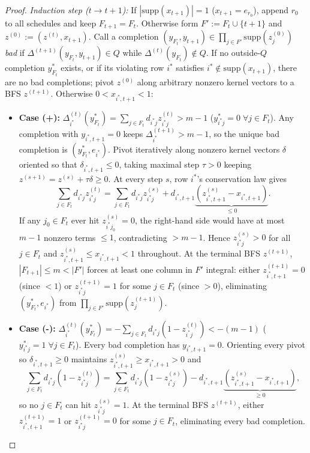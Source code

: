 \documentclass[11pt]{article}
\theoremstyle{definition}
\newcommand{\disc}{\Delta}
\begin{document}
\begin{proof}
\emph{Induction step ($t\to t+1$):} If $|\mathrm{supp}(x_{t+1})|=1$ ($x_{t+1}=e_{r_0}$), append $r_0$ to all schedules and keep $F_{t+1}=F_t$. Otherwise form $F':=F_t\cup\{t+1\}$ and $z^{(0)}:=(z^{(t)},x_{t+1})$. Call a completion $(y_{F_t},y_{t+1})\in\prod_{j\in F'}\mathrm{supp}(z_j^{(0)})$ \emph{bad} if $\disc^{(t+1)}(y_{F_t},y_{t+1})\in Q$ while $\disc^{(t)}(y_{F_t})\notin Q$. If no outside-$Q$ completion $y_{F_t}^*$ exists, or if its violating row $i^*$ satisfies $i^*\notin\mathrm{supp}(x_{t+1})$, there are no bad completions; pivot $z^{(0)}$ along arbitrary nonzero kernel vectors to a BFS $z^{(t+1)}$. Otherwise $0<x_{i^*,t+1}<1$:
\begin{itemize}
\item \textbf{Case (+):} $\disc_{i^*}^{(t)}(y_{F_t}^*)=\sum_{j\in F_t} d_{i^*j}z_{i^*j}^{(t)}>m-1$ ($y_{i^*j}^*=0\;\forall j\in F_t$). Any completion with $y_{i^*,t+1}=0$ keeps $\disc_{i^*}^{(t+1)}>m-1$, so the unique bad completion is $(y_{F_t}^*,e_{i^*})$. Pivot iteratively along nonzero kernel vectors $\delta$ oriented so that $\delta_{i^*,t+1}\le 0$, taking maximal step $\tau>0$ keeping $z^{(s+1)}=z^{(s)}+\tau\delta\ge 0$. At every step $s$, row $i^*$'s conservation law gives
\[
 \sum_{j\in F_t} d_{i^*j}z_{i^*j}^{(t)} = \sum_{j\in F_t} d_{i^*j}z_{i^*j}^{(s)} + d_{i^*,t+1}\underbrace{(z_{i^*,t+1}^{(s)}-x_{i^*,t+1})}_{\le 0}.
\]
If any $j_0\in F_t$ ever hit $z_{i^*j_0}^{(s)}=0$, the right-hand side would have at most $m-1$ nonzero terms $\le 1$, contradicting $>m-1$. Hence $z_{i^*j}^{(s)}>0$ for all $j\in F_t$ and $z_{i^*,t+1}^{(s)}\le x_{i^*,t+1}<1$ throughout. At the terminal BFS $z^{(t+1)}$, $|F_{t+1}|\le m<|F'|$ forces at least one column in $F'$ integral: either $z_{i^*,t+1}^{(t+1)}=0$ (since $<1$) or $z_{i^*j}^{(t+1)}=1$ for some $j\in F_t$ (since $>0$), eliminating $(y_{F_t}^*,e_{i^*})$ from $\prod_{j\in F'}\mathrm{supp}(z_j^{(t+1)})$.
\item \textbf{Case (-):} $\disc_{i^*}^{(t)}(y_{F_t}^*)=-\sum_{j\in F_t} d_{i^*j}(1-z_{i^*j}^{(t)})<-(m-1)$ ($y_{i^*j}^*=1\;\forall j\in F_t$). Every bad completion has $y_{i^*,t+1}=0$. Orienting every pivot so $\delta_{i^*,t+1}\ge 0$ maintains $z_{i^*,t+1}^{(s)}\ge x_{i^*,t+1}>0$ and
\[
 \sum_{j\in F_t} d_{i^*j}(1-z_{i^*j}^{(t)}) = \sum_{j\in F_t} d_{i^*j}(1-z_{i^*j}^{(s)}) - d_{i^*,t+1}\underbrace{(z_{i^*,t+1}^{(s)}-x_{i^*,t+1})}_{\ge 0},
\]
so no $j\in F_t$ can hit $z_{i^*j}^{(s)}=1$. At the terminal BFS $z^{(t+1)}$, either $z_{i^*,t+1}^{(t+1)}=1$ or $z_{i^*j}^{(t+1)}=0$ for some $j\in F_t$, eliminating every bad completion.
\end{itemize}

\end{proof}
\end{document}
